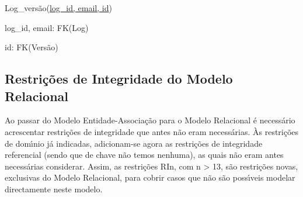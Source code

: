 \documentclass[11pt,a4paper]{article}
\begin{document}
\begin{description}[noitemsep]
	\item Log\_vers\~{a}o(\underline{log\_id, email, id})
	\item log\_id, email: FK(Log)
	\item id: FK(Vers\~{a}o)
\end{description}

\newpage

\subsection{Restri\c{c}\~oes de Integridade do Modelo Relacional}

Ao passar do Modelo Entidade-Associa\c{c}\~{a}o para o Modelo Relacional \'{e} necess\'{a}rio
acrescentar restri\c{c}\~{o}es de integridade que antes n\~{a}o eram necess\'{a}rias. \`{A}s
restri\c{c}\~{o}es de dom\'{\i}nio j\'{a} indicadas, adicionam-se agora as restri\c{c}\~{o}es de
integridade referencial (sendo que de chave n\~{a}o temos nenhuma), as quais n\~{a}o
eram antes necess\'{a}rias considerar. Assim, as restri\c{c}\~{o}es RIn, com n \textgreater{} 13, s\~{a}o
restri\c{c}\~{o}es novas, exclusivas do Modelo Relacional, para cobrir casos que n\~{a}o s\~{a}o
poss\'{\i}veis modelar directamente neste modelo.
\end{document}
